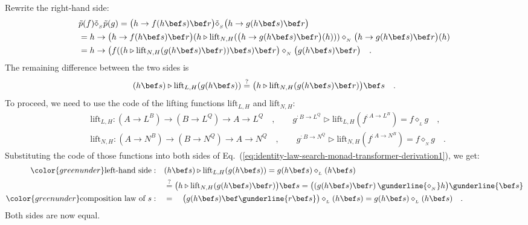 Rewrite the right-hand side:
\begin{align*}
 & \tilde{p}(f)\tilde{\diamond}_{_{S}}\tilde{p}(g)=\big(h\rightarrow f(h\bef s)\bef r\big)\tilde{\diamond}_{_{S}}\big(h\rightarrow g(h\bef s)\bef r\big)\\
 & =h\rightarrow\big(h\rightarrow f(h\bef s)\bef r\big)(h\triangleright\text{lift}_{N,H}(\big(h\rightarrow g(h\bef s)\bef r\big)(h)))\diamond_{_{N}}\big(h\rightarrow g(h\bef s)\bef r\big)(h)\\
 & =h\rightarrow\big(f((h\triangleright\text{lift}_{N,H}(g(h\bef s)\bef r))\bef s)\bef r\big)\diamond_{_{N}}\big(g(h\bef s)\bef r\big)\quad.
\end{align*}
The remaining difference between the two sides is
\begin{equation}
(h\bef s)\triangleright\text{lift}_{L,H}(g(h\bef s))\overset{?}{=}\big(h\triangleright\text{lift}_{N,H}(g(h\bef s)\bef r)\big)\bef s\quad.\label{eq:identity-law-search-monad-transformer-derivation1}
\end{equation}
To proceed, we need to use the code of the lifting functions $\text{lift}_{L,H}$
and $\text{lift}_{N,H}$:
\begin{align*}
 & \text{lift}_{L,H}:(A\rightarrow L^{B})\rightarrow(B\rightarrow L^{Q})\rightarrow A\rightarrow L^{Q}\quad,\quad\quad g^{:B\rightarrow L^{Q}}\triangleright\text{lift}_{L,H}(f^{:A\rightarrow L^{B}})=f\diamond_{_{L}}g\quad,\\
 & \text{lift}_{N,H}:(A\rightarrow N^{B})\rightarrow(B\rightarrow N^{Q})\rightarrow A\rightarrow N^{Q}\quad,\quad\quad g^{:B\rightarrow N^{Q}}\triangleright\text{lift}_{N,H}(f^{:A\rightarrow N^{B}})=f\diamond_{_{N}}g\quad.
\end{align*}
Substituting the code of those functions into both sides of Eq.~(\ref{eq:identity-law-search-monad-transformer-derivation1}),
we get:
\begin{align*}
{\color{greenunder}\text{left-hand side}:}\quad & (h\bef s)\triangleright\text{lift}_{L,H}(g(h\bef s))=g(h\bef s)\diamond_{_{L}}(h\bef s)\\
 & \overset{?}{=}\big(h\triangleright\text{lift}_{N,H}(g(h\bef s)\bef r)\big)\bef s=\big((g(h\bef s)\bef r)\,\gunderline{\diamond_{_{N}}}h\big)\gunderline{\bef s}\\
{\color{greenunder}\text{composition law of }s:}\quad & =\quad\big(g(h\bef s)\bef\gunderline{r\bef s}\big)\diamond_{_{L}}(h\bef s)=g(h\bef s)\diamond_{_{L}}(h\bef s)\quad.
\end{align*}
Both sides are now equal.

